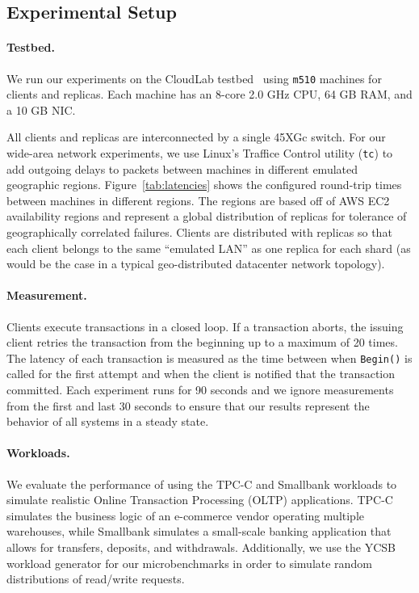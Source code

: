\subsection{Experimental Setup}
\paragraph{Testbed.} We run our experiments on the CloudLab
testbed~\cite{cloudlab} using \texttt{m510} machines for clients and replicas.
Each machine has an 8-core 2.0 GHz CPU, 64 GB RAM, and a 10 GB NIC.

All clients and replicas are interconnected by a single 45XGc switch. For our
wide-area network experiments, we use Linux's Traffice Control utility (\texttt{tc})
to add outgoing delays to packets between machines in different emulated
geographic regions. Figure~\ref{tab:latencies} shows the configured round-trip
times between machines in different regions. The regions are based off of AWS
EC2 availability regions and represent a global distribution of replicas for
tolerance of geographically correlated failures. Clients are distributed with
replicas so that each client belongs to the same ``emulated LAN'' as one replica
for each shard (as would be the case in a typical geo-distributed datacenter
network topology).

\paragraph{Measurement.} Clients execute transactions in a closed loop. If a
transaction aborts, the issuing client retries the transaction from the
beginning up to a maximum of 20 times. The latency of each transaction is 
measured as the time between when \texttt{Begin()} is called for the first
attempt and when the client is notified that the transaction committed. Each
experiment runs for 90 seconds and we ignore measurements from the first and
last 30 seconds to ensure that our results represent the behavior of all systems
in a steady state.

\paragraph{Workloads.} We evaluate the performance of \sys using the TPC-C and Smallbank workloads to simulate realistic Online Transaction Processing (OLTP) applications. TPC-C simulates the business logic of an e-commerce vendor operating multiple warehouses, while Smallbank simulates a small-scale banking application that allows for transfers, deposits, and withdrawals. Additionally, we use the YCSB workload generator for our microbenchmarks in order to simulate random distributions of read/write requests. 

